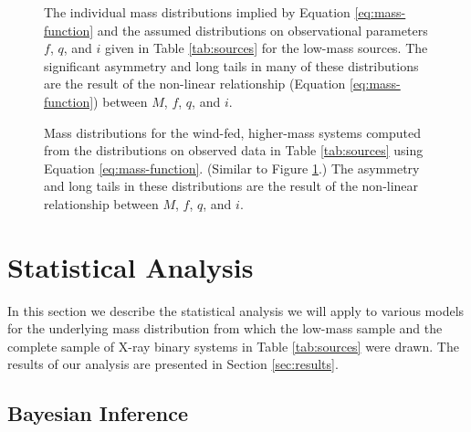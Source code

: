 \documentclass[preprint]{aastex}
\begin{document}
\begin{figure}
  \begin{center}
  \end{center}

  \caption{\label{fig:low-masses} The individual mass distributions
    implied by Equation \eqref{eq:mass-function} and the assumed
    distributions on observational parameters $f$, $q$, and $i$ given
    in Table \ref{tab:sources} for the low-mass sources.  The
    significant asymmetry and long tails in many of these
    distributions are the result of the non-linear relationship
    (Equation \eqref{eq:mass-function}) between $M$, $f$, $q$, and
    $i$.}
\end{figure}

\begin{figure}
  \begin{center}
  \end{center}
  \caption{\label{fig:high-masses} Mass distributions for the
    wind-fed, higher-mass systems computed from the distributions on
    observed data in Table \ref{tab:sources} using Equation
    \eqref{eq:mass-function}.  (Similar to Figure
    \ref{fig:low-masses}.)  The asymmetry and long tails in these
    distributions are the result of the non-linear relationship
    between $M$, $f$, $q$, and $i$.}
\end{figure}

\section{Statistical Analysis}
\label{sec:models}

In this section we describe the statistical analysis we will apply to
various models for the underlying mass distribution from which the
low-mass sample and the complete sample of X-ray binary systems in
Table \ref{tab:sources} were drawn.  The results of our analysis are
presented in Section \ref{sec:results}.

\subsection{Bayesian Inference}
\end{document}
